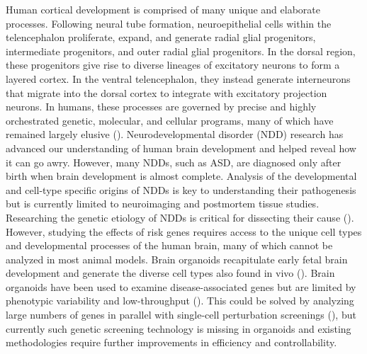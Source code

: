 Human cortical development is comprised of many unique and elaborate processes. Following neural tube formation, neuroepithelial cells within the telencephalon proliferate, expand, and generate radial glial progenitors, intermediate progenitors, and outer radial glial progenitors. In the dorsal region, these progenitors give rise to diverse lineages of excitatory neurons to form a layered cortex. In the ventral telencephalon, they instead generate interneurons that migrate into the dorsal cortex to integrate with excitatory projection neurons. In humans, these processes are governed by precise and highly orchestrated genetic, molecular, and cellular programs, many of which have remained largely elusive (\cite{libe-philippot_cellular_2021}). 
Neurodevelopmental disorder (NDD) research has advanced our understanding of human brain development and helped reveal how it can go awry. However, many NDDs, such as ASD, are diagnosed only after birth when brain development is almost complete. Analysis of the developmental and cell-type specific origins of NDDs is key to understanding their pathogenesis but is currently limited to neuroimaging and postmortem tissue studies. 
Researching the genetic etiology of NDDs is critical for dissecting their cause (\cite{hu_diverse_2014,satterstrom_large-scale_2020,torre-ubieta_advancing_2016}). However, studying the effects of risk genes requires access to the unique cell types and developmental processes of the human brain, many of which cannot be analyzed in most animal models. Brain organoids recapitulate early fetal brain development and generate the diverse cell types also found in vivo (\cite{lancaster_cerebral_2013}). Brain organoids have been used to examine disease-associated genes but are limited by phenotypic variability and low-throughput (\cite{lancaster_cerebral_2013,mariani_modeling_2012,paulsen_autism_2022}). This could be solved by analyzing large numbers of genes in parallel with single-cell perturbation screenings (\cite{dixit_perturb-seq_2016,jaitin_massively_2014,adamson_multiplexed_2016}), but currently such genetic screening technology is missing in organoids and existing methodologies require further improvements in efficiency and controllability. 
